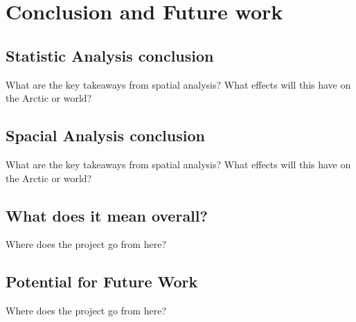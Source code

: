 
\chapter{Conclusion and Future work}

\section{Statistic Analysis conclusion}

What are the key takeaways from spatial analysis?
What effects will this have on the Arctic or world?

\section{Spacial Analysis conclusion}

What are the key takeaways from spatial analysis?
What effects will this have on the Arctic or world?

\section{What does it mean overall?}


Where does the project go from here?

\section{Potential for Future Work}


Where does the project go from here?